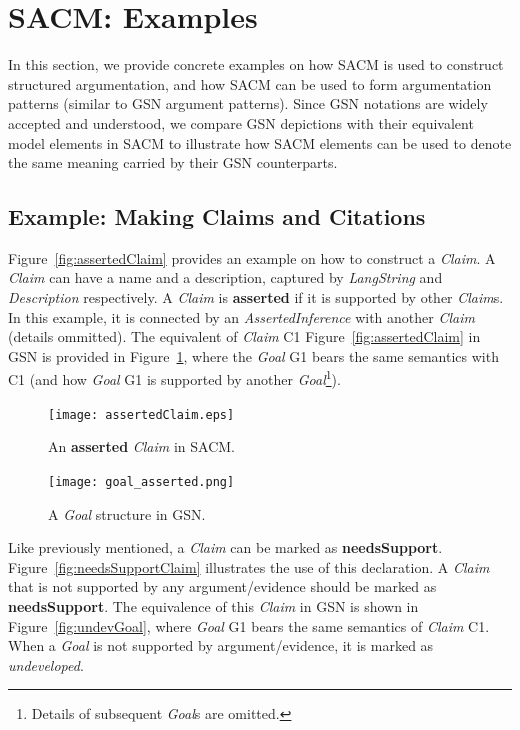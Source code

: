 \section{SACM: Examples}
In this section, we provide concrete examples on how SACM is used to construct structured argumentation, and how SACM can be used to form argumentation patterns (similar to GSN argument patterns). 
Since GSN notations are widely accepted and understood, we compare GSN depictions with their equivalent model elements in SACM to illustrate how SACM elements can be used to denote the same meaning carried by their GSN counterparts.

\subsection{Example: Making Claims and Citations}
\label{sec:claims}
Figure~\ref{fig:assertedClaim} provides an example on how to construct a \textit{Claim}. 
A \textit{Claim} can have a name and a description, captured by \textit{LangString} and \textit{Description} respectively. 
A \textit{Claim} is \textbf{asserted} if it is supported by other \textit{Claim}s. 
In this example, it is connected by an \textit{AssertedInference} with another \textit{Claim} (details ommitted). 
The equivalent of \textit{Claim} C1 Figure~\ref{fig:assertedClaim} in GSN is provided in Figure~\ref{fig:goalingsn}, where the \textit{Goal} G1 bears the same semantics with C1 (and how \textit{Goal} G1 is supported by another \textit{Goal}\footnote{Details of subsequent \textit{Goal}s are omitted.}).

\begin{figure}[ht!]
	\centering
	\begin{minipage}[b]{0.7\textwidth}
		\texttt{[image: assertedClaim.eps]}
		\caption{An \textbf{asserted} \textit{Claim} in SACM.}
		\label{fig:assertedClaim}
	\end{minipage}
	\hfill
	\begin{minipage}[b]{0.28\textwidth}
		\texttt{[image: goal\_asserted.png]}
		\caption{A \textit{Goal} structure in GSN.}
		\label{fig:goalingsn}
	\end{minipage}
\end{figure}

Like previously mentioned, a \textit{Claim} can be marked as \textbf{needsSupport}. Figure~\ref{fig:needsSupportClaim} illustrates the use of this declaration. 
A \textit{Claim} that is not supported by any argument/evidence should be marked as \textbf{needsSupport}. 
The equivalence of this \textit{Claim} in GSN is shown in Figure~\ref{fig:undevGoal}, where \textit{Goal} G1 bears the same semantics of \textit{Claim} C1. 
When a \textit{Goal} is not supported by argument/evidence, it is marked as \textit{undeveloped}. 

